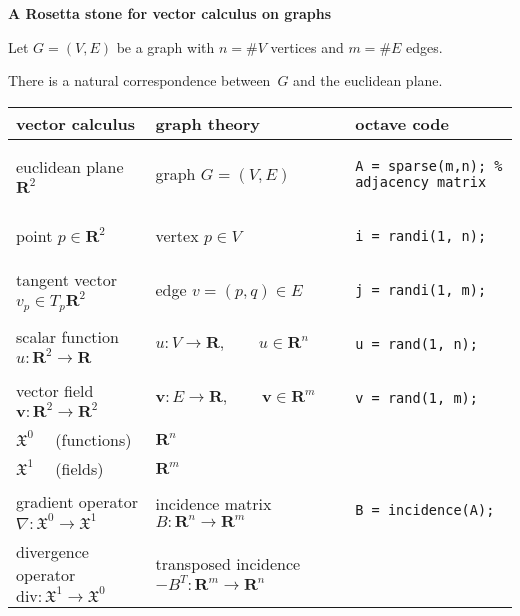 \documentclass{article}
\def\R{\mathbf{R}}
\begin{document}
\thispagestyle{empty}

{\bf A Rosetta stone for vector calculus on graphs}

Let $G=(V,E)$ be a graph with $n=\#V$ vertices and $m=\#E$ edges.

There is a natural correspondence between~$G$ and the euclidean plane.

\bigskip

\setlength{\extrarowheight}{3pt}
\begin{tabular}{l|l|b{}}
\bf vector calculus & \bf graph theory & \bf octave code \\
\hline
euclidean plane $\R^2$ & graph $G=(V,E)$ &
\begin{verbatim}
A = sparse(m,n); % adjacency matrix
\end{verbatim}
\\
point $p\in\R^2$ & vertex $p\in V$ &
\begin{verbatim}
i = randi(1, n);
\end{verbatim}
\\
tangent vector $v_p\in T_p\R^2$ & edge $v=(p,q)\in E$ &
\begin{verbatim}
j = randi(1, m);
\end{verbatim}
\\
scalar function $u:\R^2\to\R$ & $u:V\to\R,\qquad u\in\R^n$ &
\begin{verbatim}
u = rand(1, n);
\end{verbatim}
\\
vector field $\mathbf{v}:\R^2\to\R^2$ & $\mathbf{v}:E\to\R,\qquad\mathbf{v}\in\R^m$&
\begin{verbatim}
v = rand(1, m);
\end{verbatim}
\\
$\mathfrak{X}^0\quad$ \color{gray}(functions) & $\R^n$ & \\
$\mathfrak{X}^1\quad$ \color{gray}(fields) & $\R^m$ & \\
gradient operator $\nabla:\mathfrak{X}^0\to\mathfrak{X}^1$ &
incidence matrix $B:\R^n\to\R^m$ &
\begin{verbatim}
B = incidence(A);
\end{verbatim}
\\
divergence operator $\mathrm{div}:\mathfrak{X}^1\to\mathfrak{X}^0$ &
transposed incidence $-B^T:\R^m\to\R^n$ &

\end{tabular}
\end{document}

